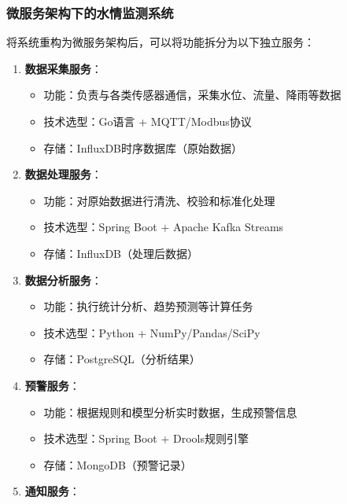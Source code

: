 \subsubsection{微服务架构下的水情监测系统}\label{ux5faeux670dux52a1ux67b6ux6784ux4e0bux7684ux6c34ux60c5ux76d1ux6d4bux7cfbux7edf}

将系统重构为微服务架构后，可以将功能拆分为以下独立服务：

\begin{enumerate}
\def\labelenumi{\arabic{enumi}.}
\tightlist
\item
  \textbf{数据采集服务}：

  \begin{itemize}
  \tightlist
  \item
    功能：负责与各类传感器通信，采集水位、流量、降雨等数据
  \item
    技术选型：Go语言 + MQTT/Modbus协议
  \item
    存储：InfluxDB时序数据库（原始数据）
  \end{itemize}
\item
  \textbf{数据处理服务}：

  \begin{itemize}
  \tightlist
  \item
    功能：对原始数据进行清洗、校验和标准化处理
  \item
    技术选型：Spring Boot + Apache Kafka Streams
  \item
    存储：InfluxDB（处理后数据）
  \end{itemize}
\item
  \textbf{数据分析服务}：

  \begin{itemize}
  \tightlist
  \item
    功能：执行统计分析、趋势预测等计算任务
  \item
    技术选型：Python + NumPy/Pandas/SciPy
  \item
    存储：PostgreSQL（分析结果）
  \end{itemize}
\item
  \textbf{预警服务}：

  \begin{itemize}
  \tightlist
  \item
    功能：根据规则和模型分析实时数据，生成预警信息
  \item
    技术选型：Spring Boot + Drools规则引擎
  \item
    存储：MongoDB（预警记录）
  \end{itemize}
\item
  \textbf{通知服务}：


\end{enumerate}
